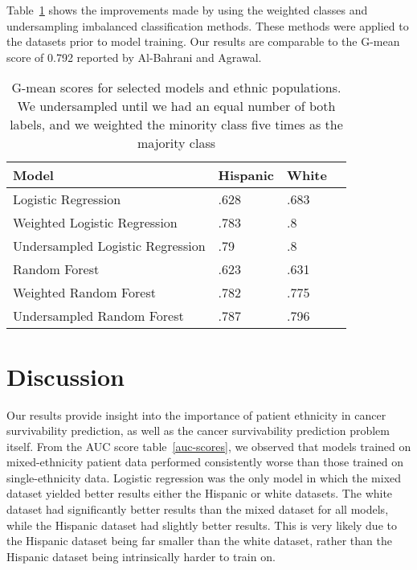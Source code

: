 \documentclass[review]{elsarticle}
\begin{document}
Table~\ref{gmean-compare} shows the improvements made by using the weighted classes and undersampling imbalanced classification methods. These methods were applied to the datasets prior to model training. Our results are comparable to the G-mean score of 0.792 reported by Al-Bahrani and Agrawal\cite{al2017survivability}.
\begin{table}[H]
	\centering
	\begin{tabular}{llll}
		\textbf{Model}               & \textbf{Hispanic} & \textbf{White} &   \\ \hline
		Logistic Regression          & .628              & .683           &   \\
		Weighted Logistic Regression & .783              & .8             &   \\
		Undersampled Logistic Regression & .79 & .8 & \\ 
		Random Forest                & .623              & .631           &   \\
		Weighted Random Forest       & .782              & .775           &  \\
		Undersampled Random Forest & .787 & .796
	\end{tabular}
	\caption{G-mean scores for selected models and ethnic populations. We undersampled until we had an equal number of both labels, and we weighted the minority class five times as the majority class}
	\label{gmean-compare}
\end{table}

\section{Discussion}
Our results provide insight into the importance of patient ethnicity in cancer survivability prediction, as well as the cancer survivability prediction problem itself. From the AUC score table~\ref{auc-scores}, we observed that models trained on mixed-ethnicity patient data performed consistently worse than those trained on single-ethnicity data. Logistic regression was the only model in which the mixed dataset yielded better results either the Hispanic or white datasets. The white dataset had significantly better results than the mixed dataset for all models, while the Hispanic dataset had slightly better results. This is very likely due to the Hispanic dataset being far smaller than the white dataset, rather than the Hispanic dataset being intrinsically harder to train on. 
\end{document}
